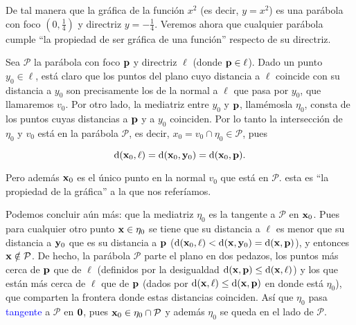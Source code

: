 \documentclass{article}
\theoremstyle{definicion}
\theoremstyle{definition}             %
\theoremstyle{definition}             %
\theoremstyle{definition}
\theoremstyle{definition}
\theoremstyle{observacion}
\theoremstyle{definition}
\theoremstyle{plain}
\theoremstyle{definition}
\theoremstyle{afirmacion}
\theoremstyle{notation}
\theoremstyle{definition}
\begin{document}
    De tal manera que la gráfica de la función \(x^{2}\) (es decir, \(y = x^{2}\)) es una parábola con foco \((0, \frac{1}{4})\) y directriz \(y = -\frac{1}{4}\). Veremos ahora que cualquier parábola cumple ``la propiedad de ser gráfica de una función'' respecto de su directriz.

    Sea \(\mathcal{P}\) la parábola con foco \(\vb{p}\) y directriz \(\ell\) (donde \(\vb{p} \in \ell\)). Dado un punto \(y_{0} \in \ell\), está claro que los puntos del plano cuyo distancia a \(\ell\) coincide con su distancia a \(y_{0}\) son precisamente los de la normal a \(\ell\) que pasa por \(y_{0}\), que llamaremos \(v_{0}\). Por otro lado, la mediatriz entre \(y_{0}\) y \(\vb{p}\), llamémosla \(\eta_{0}\), consta de los puntos cuyas distancias a \(\vb{p}\) y a \(y_{0}\) coinciden. Por lo tanto la intersección de \(\eta_{0}\) y \(v_{0}\) está en la parábola \(\mathcal{P}\), es decir, \(x_{0} = v_{0} \cap \eta_{0} \in \mathcal{P}\), pues

    \begin{equation*}
        \textrm{d}(\vb{x}_{0}, \ell) = \textrm{d}(\vb{x}_{0}, \vb{y}_{0}) = \textrm{d}(\vb{x}_{0}, \vb{p}).
    \end{equation*}

    Pero además \(\vb{x}_{0}\) es el único punto en la normal \(v_{0}\) que está en \(\mathcal{P}\). esta es ``la propiedad de la gráfica'' a la que nos referíamos. 

    Podemos concluir aún más: que la mediatriz \(\eta_{0}\) es la tangente a \(\mathcal{P}\) en \(\vb{x}_{0}\). Pues para cualquier otro punto \(\vb{x} \in \eta_{0}\) se tiene que su distancia a \(\ell\) es menor que su distancia a \(\vb{y}_{0}\) que es su distancia a \(\vb{p}\) (\(\textrm{d}(\vb{x}_{0}, \ell) < \textrm{d}(\vb{x}, \vb{y}_{0}) = \textrm{d}(\vb{x}, \vb{p})\)), y entonces \(\vb{x} \notin \mathcal{P}\). De hecho, la parábola \(\mathcal{P}\) parte el plano en dos pedazos, los puntos más cerca de \(\vb{p}\) que de \(\ell\) (definidos por la desigualdad \(\textrm{d}(\vb{x}, \vb{p}) \leq \textrm{d}(\vb{x}, \ell)\)) y los que están más cerca de \(\ell\) que de \(\vb{p}\) (dados por \(\textrm{d}(\vb{x}, \ell) \leq \textrm{d}(\vb{x}, \vb{p})\) en donde está \(\eta_{0}\)), que comparten la frontera donde estas distancias coinciden. Así que \(\eta_{0}\) pasa \textcolor{blue}{tangente} a \(\mathcal{P}\) en \(\vb{0}\), pues \(\vb{x}_{0} \in \eta_{0} \cap \mathcal{P}\) y además \(\eta_{0}\) se queda en el lado de \(\mathcal{P}\).

\end{document}
